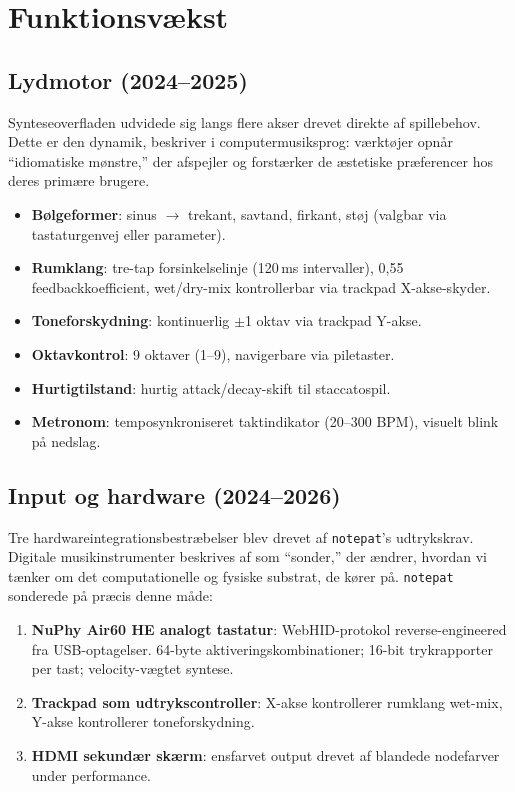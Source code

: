 \documentclass[10pt,letterpaper,twocolumn]{article}
\begin{document}
\section{Funktionsvækst}

\subsection{Lydmotor (2024--2025)}

Synteseoverfladen udvidede sig langs flere akser drevet direkte af spillebehov. Dette er den dynamik, \citet{mcpherson2020idiomatic} beskriver i computermusiksprog: værktøjer opnår ``idiomatiske mønstre,'' der afspejler og forstærker de æstetiske præferencer hos deres primære brugere.

\begin{itemize}
  \item \textbf{Bølgeformer}: sinus $\rightarrow$ trekant, savtand, firkant, støj (valgbar via tastaturgenvej eller parameter).
  \item \textbf{Rumklang}: tre-tap forsinkelselinje (120\,ms intervaller), 0,55 feedbackkoefficient, wet/dry-mix kontrollerbar via trackpad X-akse-skyder.
  \item \textbf{Toneforskydning}: kontinuerlig $\pm$1 oktav via trackpad Y-akse.
  \item \textbf{Oktavkontrol}: 9 oktaver (1--9), navigerbare via piletaster.
  \item \textbf{Hurtigtilstand}: hurtig attack/decay-skift til staccatospil.
  \item \textbf{Metronom}: temposynkroniseret taktindikator (20--300 BPM), visuelt blink på nedslag.
\end{itemize}

\subsection{Input og hardware (2024--2026)}

Tre hardwareintegrationsbestræbelser blev drevet af \texttt{notepat}'s udtrykskrav. Digitale musikinstrumenter beskrives af \citet{tahiroglu2020probes} som ``sonder,'' der ændrer, hvordan vi tænker om det computationelle og fysiske substrat, de kører på. \texttt{notepat} sonderede på præcis denne måde:

\begin{enumerate}
  \item \textbf{NuPhy Air60 HE analogt tastatur}: WebHID-protokol reverse-engineered fra USB-optagelser. 64-byte aktiveringskombinationer; 16-bit trykrapporter per tast; velocity-vægtet syntese.
  \item \textbf{Trackpad som udtrykscontroller}: X-akse kontrollerer rumklang wet-mix, Y-akse kontrollerer toneforskydning.
  \item \textbf{HDMI sekundær skærm}: ensfarvet output drevet af blandede nodefarver under performance.
\end{enumerate}
\end{document}
